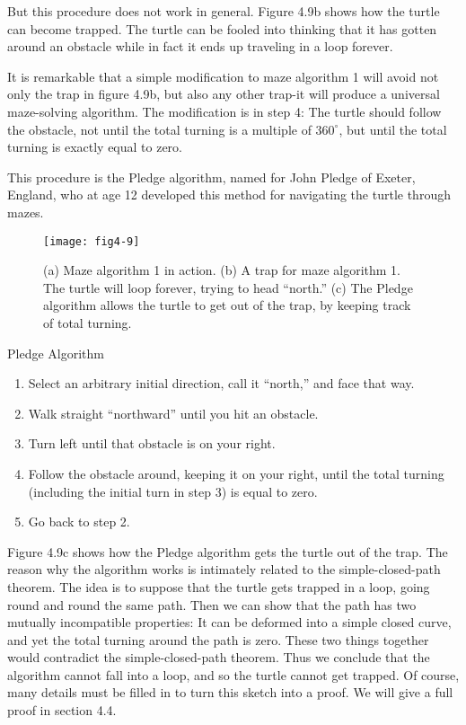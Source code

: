 \documentclass{book}
\begin{document}
But this procedure does not work in general. Figure 4.9b shows how
the turtle can become trapped. The turtle can be fooled into thinking
that it has gotten around an obstacle while in fact it ends up traveling
in a loop forever.

It is remarkable that a simple modification to maze algorithm 1 will
avoid not only the trap in figure 4.9b, but also any other trap-it will
produce a universal maze-solving algorithm. The modification is in step
4: The turtle should follow the obstacle, not until the total turning is a
multiple of $360^{\circ}$, but until the total turning is exactly equal to zero.

This
procedure is the Pledge algorithm, named for John Pledge of Exeter,
England, who at age 12 developed this method for navigating the turtle
through mazes.

\begin{figure}
\begin{center}
\texttt{[image: fig4-9]}
\caption{(a) Maze algorithm 1 in action. (b) A trap for maze algorithm 1. The turtle will loop forever, trying to head ``north.'' (c) The Pledge algorithm allows the turtle to get out of the trap, by keeping track of total turning.}
\end{center}
\end{figure}


Pledge Algorithm
\begin{enumerate}
\item Select an arbitrary initial direction, call it ``north,'' and face that
way.
\item Walk straight ``northward'' until you hit an obstacle.
\item Turn left until that obstacle is on your right.
\item Follow the obstacle around, keeping it on your right, until the total
turning (including the initial turn in step 3) is equal to zero.
\item Go back to step 2.
\end{enumerate}

Figure 4.9c shows how the Pledge algorithm gets the turtle out of
the trap. The reason why the algorithm works is intimately related to
the simple-closed-path theorem. The idea is to suppose that the turtle
gets trapped in a loop, going round and round the same path. Then
we can show that the path has two mutually incompatible properties: It
can be deformed into a simple closed curve, and yet the total turning
around the path is zero. These two things together would contradict
the simple-closed-path theorem. Thus we conclude that the algorithm
cannot fall into a loop, and so the turtle cannot get trapped. Of course,
many details must be filled in to turn this sketch into a proof. We will
give a full proof in section 4.4.
\end{document}
